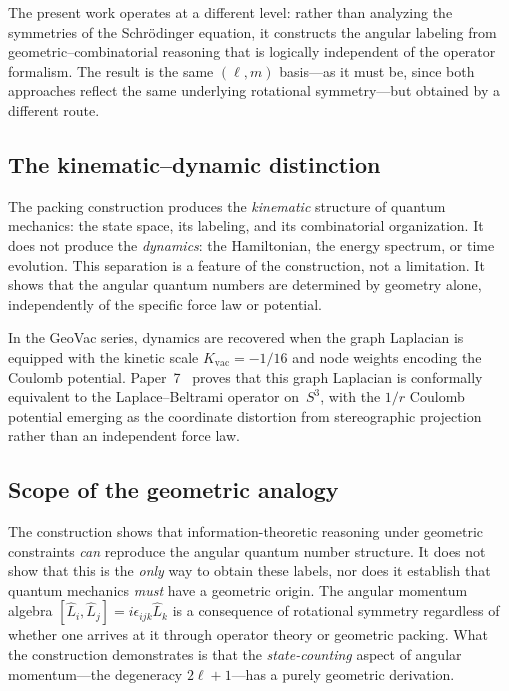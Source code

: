 \documentclass[aps,prl,reprint,amsmath,amssymb]{revtex4-2}
\begin{document}
The present work operates at a different level: rather than analyzing
the symmetries of the Schr\"odinger equation, it constructs the
angular labeling from geometric--combinatorial reasoning that is
logically independent of the operator formalism.  The result is the
same $(\ell, m)$ basis---as it must be, since both approaches reflect
the same underlying rotational symmetry---but obtained by a different
route.

\subsection{The kinematic--dynamic distinction}

The packing construction produces the \emph{kinematic} structure of
quantum mechanics: the state space, its labeling, and its
combinatorial organization.  It does not produce the \emph{dynamics}:
the Hamiltonian, the energy spectrum, or time evolution.  This
separation is a feature of the construction, not a limitation.  It
shows that the angular quantum numbers are determined by geometry
alone, independently of the specific force law or potential.

In the GeoVac series, dynamics are recovered when the graph Laplacian
is equipped with the kinetic scale $K_{\mathrm{vac}} = -1/16$ and
node weights encoding the Coulomb potential.  Paper~7~\cite{paper7}
proves that this graph Laplacian is conformally equivalent to the
Laplace--Beltrami operator on~$S^3$, with the $1/r$ Coulomb potential
emerging as the coordinate distortion from stereographic projection
rather than an independent force law.

\subsection{Scope of the geometric analogy}

The construction shows that information-theoretic reasoning under
geometric constraints \emph{can} reproduce the angular quantum number
structure.  It does not show that this is the \emph{only} way to
obtain these labels, nor does it establish that quantum mechanics
\emph{must} have a geometric origin.  The angular momentum algebra
$[\hat{L}_i, \hat{L}_j] = i\epsilon_{ijk}\hat{L}_k$ is a consequence
of rotational symmetry regardless of whether one arrives at it through
operator theory or geometric packing.  What the construction
demonstrates is that the \emph{state-counting} aspect of angular
momentum---the degeneracy $2\ell + 1$---has a purely geometric
derivation.
\end{document}
